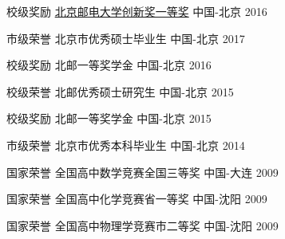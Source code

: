 \begin{cvhonors}
\cvhonor
{校级奖励} %
{\href{http://my.bupt.edu.cn/detach.portal?.pmn=view&action=browser&.ia=false&.pen=pe1144&bulletinId=fc089be9-6d81-11e6-ae27-4f4915a784ea}{北京邮电大学创新奖一等奖} } %
{中国-北京} %
{2016} %


\cvhonor
{市级荣誉} %
{北京市优秀硕士毕业生} %
{中国-北京} %
{2017} %

\cvhonor
{校级奖励} %
{北邮一等奖学金} %
{中国-北京} %
{2016} %

\cvhonor
{校级荣誉} %
{北邮优秀硕士研究生} %
{中国-北京} %
{2015} %


\cvhonor
{校级奖励} %
{北邮一等奖学金} %
{中国-北京} %
{2015} %


\cvhonor
{市级荣誉} %
{北京市优秀本科毕业生} %
{中国-北京} %
{2014} %


\cvhonor
{国家荣誉} %
{全国高中数学竞赛全国三等奖} %
{中国-大连} %
{2009} %

\cvhonor
{国家荣誉} %
{全国高中化学竞赛省一等奖} %
{中国-沈阳} %
{2009} %

\cvhonor
{国家荣誉} %
{全国高中物理学竞赛市二等奖} %
{中国-沈阳} %
{2009} %


\end{cvhonors}
